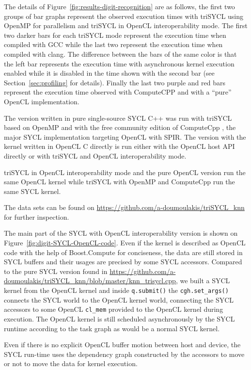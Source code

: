 \documentclass[sigplan]{acmart}
\begin{document}
The details of Figure~\ref{fig:results-digit-recognition} are as follows,
the first two groups of bar graphs represent the observed execution times
with triSYCL using OpenMP for parallelism and triSYCL in OpenCL interoperability
mode. The first two darker bars for each triSYCL mode represent the execution
time when compiled with GCC while the last two represent the execution time when
compiled with clang. The difference between the bars of the same color is that
the left bar represents the execution time with asynchronous kernel execution
enabled while it is disabled in the time shown with the second bar (see
Section~\ref{sec:profiling} for details).
Finally the last two purple and red bars represent the execution time observed
with ComputeCPP and with a ``pure'' OpenCL implementation.


The version written in pure single-source SYCL C++ was run with
triSYCL based on OpenMP and with the free community edition of
ComputeCpp \cite{ComputeCpp}, the major SYCL implementation
\cite{ComputeCpp} targeting OpenCL with SPIR. The version with the
kernel written in OpenCL C directly is run either with the OpenCL host
API directly or with triSYCL and OpenCL interoperability mode.

triSYCL in OpenCL interoperability mode and the pure OpenCL version run
the same OpenCL kernel while triSYCL with OpenMP and ComputeCpp run the
same SYCL kernel.

The data sets can be found on
\url{https://github.com/a-doumoulakis/triSYCL_knn} for further
inspection.

The main part of the SYCL with OpenCL interoperability version is
shown on Figure~\ref{fig:digit-SYCL-OpenCL-code}. Even if the kernel is
described as OpenCL code with the help of Boost.Compute
\cite{Boost.Compute} for conciseness, the data are still stored in
SYCL buffers and their usages are precised by some SYCL
accessors. Compared to the pure SYCL version found in
\url{https://github.com/a-doumoulakis/triSYCL_knn/blob/master/knn_trisycl.cpp},
we built a SYCL kernel from the OpenCL kernel and inside
\lstinline|q.submit()| the \lstinline|cgh.set_args()| connects the
SYCL world to the OpenCL kernel world, connecting the SYCL accessors
to some OpenCL \lstinline|cl_mem| provided to the OpenCL kernel during
execution. The OpenCL kernel is still scheduled asynchronously by the
SYCL runtime according to the task graph as would be a normal SYCL
kernel.

Even if there is no explicit OpenCL buffer motion between host and
device, the SYCL run-time uses the dependency graph constructed by the
accessors to move or not to move the data for kernel execution.
\end{document}
